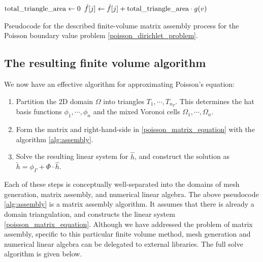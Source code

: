 \begin{algorithm}
{{{{            }
        }
        $\text{total\_triangle\_area} \leftarrow 0$\;
        $\hat{f}[j] \leftarrow \hat{f}[j] + \text{total\_triangle\_area}\cdot g(v)$\;
    }
    \;
}
    \caption{Pseudocode for the described finite-volume matrix assembly process for the Poisson boundary value problem \eqref{poisson_dirichlet_problem}.}
\end{algorithm}
\newpage

\subsection{The resulting finite volume algorithm}
We now have an effective algorithm for approximating Poisson's equation:
\begin{enumerate}
    \item Partition the 2D domain $\Omega$ into triangles $T_1,\cdots,T_{n_T}$. This determines the hat basis functions $\phi_1,\cdots,\phi_n$
         and the mixed Voronoi cells $\Omega_1,\cdots,\Omega_n$.
    \item Form the matrix and right-hand-side in \eqref{poisson_matrix_equation} with the algorithm \ref{alg:assembly}.
    \item Solve the resulting linear system for $\hat{h}$, and construct the solution as $\tilde{h} = \phi_\Gamma + \Phi\cdot\hat{h}$.
\end{enumerate}
Each of these steps is conceptually well-separated into the domains of
mesh generation, matrix assembly, and numerical linear algebra. The above pseudocode \ref{alg:assembly} is a matrix assembly algorithm.
It assumes that there is already a domain triangulation, and constructs the linear system \eqref{poisson_matrix_equation}.
Although we have addressed the
problem of matrix assembly, specific to this particular finite volume method, mesh generation and numerical linear algebra can be delegated to external libraries.
The full solve algorithm is given below.

